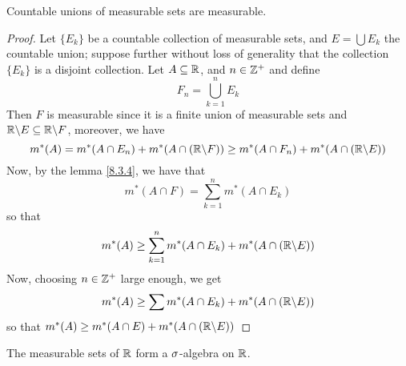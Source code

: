 \begin{lemma}\label{8.3.5}
    Countable unions of measurable sets are measurable.
\end{lemma}
\begin{proof}
    Let $\{E_k\}$ be a countable collection of measurable sets, and
    $E=\bigcup{E_k}$ the countable union; suppose further without loss of
    generality that the collection $\{E_k\}$ is a disjoint collection. Let $A
    \subseteq \mathbb{R}$, and  $n \in \mathbb{Z}^+$ and define
    \begin{equation*}
        F_n=\bigcup_{k=1}^n{E_k}
    \end{equation*}
    Then $F$ is measurable since it is a finite union of measurable sets and
    $\mathbb{R} \backslash E \subseteq \mathbb{R} \backslash F$, moreover, we have
    \begin{equation*}
        m^\ast(A)=m^\ast(A \cap E_n)+m^\ast(A \cap (\mathbb{R} \backslash F)) \geq
        m^\ast(A \cap F_n)+m^\ast(A \cap (\mathbb{R} \backslash E))
    \end{equation*}
    Now, by the lemma \ref{8.3.4}, we have that
    \begin{equation*}
        m^\ast(A \cap F)=\sum_{k=1}^n{m^\ast(A \cap E_k)}
    \end{equation*}
    so that
    \begin{equation*}
        m^\ast(A) \geq \sum_{k=1}^n{{m^\ast(A \cap E_k)+m^\ast(A \cap
        (\mathbb{R} \backslash E))}}
    \end{equation*}
    Now, choosing $n \in \mathbb{Z}^+$ large enough, we get
    \begin{equation*}
        m^\ast(A) \geq \sum{{m^\ast(A \cap E_k)+m^\ast(A \cap
        (\mathbb{R}\backslash E))}}
    \end{equation*}
    so that $m^\ast(A) \geq m^\ast(A \cap E)+m^\ast(A \cap (\mathbb{R} \backslash E))$
\end{proof}

\begin{theorem}\label{8.3.6}
    The measurable sets of $\mathbb{R}$ form a  $\sigma$-algebra on  $\mathbb{R}$.
\end{theorem}


